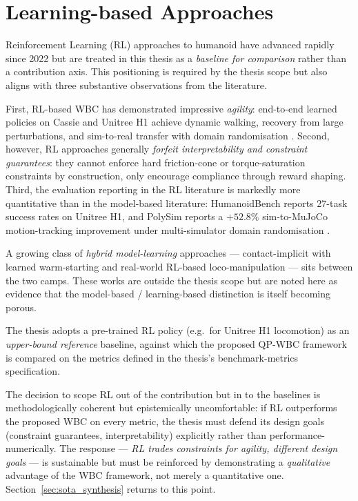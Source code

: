 \section{Learning-based Approaches}
\label{sec:sota_rl}

Reinforcement Learning (RL) approaches to humanoid \WBC{} have advanced
rapidly since 2022 but are treated in this thesis as a \emph{baseline for
comparison} rather than a contribution axis. This positioning is required
by the thesis scope but also aligns with three substantive observations
from the literature.

First, RL-based WBC has demonstrated impressive \emph{agility}:
end-to-end learned policies on Cassie and Unitree H1 achieve dynamic
walking, recovery from large perturbations, and sim-to-real transfer
with domain randomisation
\cite{Radosavovic2024,HumanoidGym2024,PolySim2025}. Second, however, RL
approaches generally \emph{forfeit interpretability and constraint
guarantees}: they cannot enforce hard friction-cone or torque-saturation
constraints by construction, only encourage compliance through reward
shaping. Third, the evaluation reporting in the RL literature is markedly
more quantitative than in the model-based literature: HumanoidBench
\cite{Sferrazza2024} reports 27-task success rates on Unitree H1, and
PolySim reports a $+52.8\%$ sim-to-MuJoCo motion-tracking improvement
under multi-simulator domain randomisation \cite{PolySim2025}.

A growing class of \emph{hybrid model-learning} approaches ---
contact-implicit \MPC{} with learned warm-starting \cite{LeCleach2024}
and real-world RL-based loco-manipulation \cite{Radosavovic2024} --- sits between
the two camps. These works are outside the thesis scope but are noted
here as evidence that the model-based / learning-based distinction is
itself becoming porous.

The thesis adopts a pre-trained RL policy (e.g.\ for Unitree H1
locomotion) as an \emph{upper-bound reference} baseline, against which
the proposed QP-WBC framework is compared on the metrics defined in the
thesis's benchmark-metrics specification.

\begin{criticalinsight}
The decision to scope RL out of the contribution but in to the baselines
is methodologically coherent but epistemically uncomfortable: if RL
outperforms the proposed WBC on every metric, the thesis must defend its
design goals (constraint guarantees, interpretability) explicitly rather
than performance-numerically. The response --- \emph{RL trades constraints
for agility, different design goals} --- is sustainable but must be
reinforced by demonstrating a \emph{qualitative} advantage of the WBC
framework, not merely a quantitative one.
Section~\ref{sec:sota_synthesis} returns to this point.
\end{criticalinsight}


